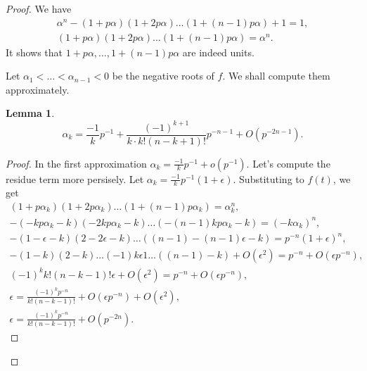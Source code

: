 \documentclass[a4paper]{article}
\newtheorem{Lem}[Thm]{Lemma}
\begin{document}
\begin{proof}
We have
\begin{gather}
\alpha^n - (1 + p\alpha) (1 + 2p\alpha) \ldots (1 + (n - 1) p\alpha) + 1 = 1  ,
\\
(1 + p\alpha) (1 + 2p\alpha) \ldots (1 + (n - 1) p\alpha) = \alpha^n.
\end{gather}
It shows that $1 + p \alpha, \ldots, 1 + (n - 1) p \alpha$ are indeed units.

Let $\alpha_1 < \ldots < \alpha_{n-1} < 0 $ be the negative roots of $f$.
We shall compute them approximately.
\begin{Lem}
\[
\alpha_k = \frac{-1}{k} p^{-1} + \frac{(-1)^{k + 1} }{ k\cdot  k! (n - k + 1)!} p^{-n-1}  + O(p^{-2 n - 1})
.\] 
\end{Lem}
\begin{proof}
In the first approximation $\alpha_k = \frac{-1}{k} p^{-1} + o(p^{-1})$.
Let's compute the residue term more persisely. 
Let $\alpha_k = \frac{-1}{k} p^{-1} ( 1 + \epsilon )$.
Substituting to $f(t)$, we get
\begin{gather*}
(1 + p\alpha_k) (1 + 2p\alpha_k) \ldots (1 + (n - 1) p\alpha_k) = \alpha_k^n, \\
- (- k p\alpha_k - k) (- 2 k p\alpha_k - k)  \ldots (- (n - 1) k p\alpha_k - k)  = (- k \alpha_k) ^n, \\
- (1 - \epsilon - k) (2 - 2 \epsilon - k)  \ldots ( (n-1) - (n-1) \epsilon - k)  = p^{-n} (1 + \epsilon)^n, \\
- (1 - k) (2 - k) \ldots (- 1) k \epsilon 1 \ldots ( (n-1) - k) + O ( \epsilon^2)
= p^{-n} + O( \epsilon p^{-n} ) , \\
(-1)^k k! ( n - k - 1)! \epsilon + O ( \epsilon^2)
= p^{-n} + O( \epsilon p^{-n} ) , \\
\epsilon = \frac{ (-1)^k p^{-n} }{ k! ( n - k - 1)! }  + O( \epsilon p^{-n} ) + O ( \epsilon^2), \\
\epsilon = \frac{ (-1)^k p^{-n} }{ k! ( n - k - 1)! }  + O( p^{-2n} ).
\end{gather*}
\end{proof}


\end{proof}
\end{document}
